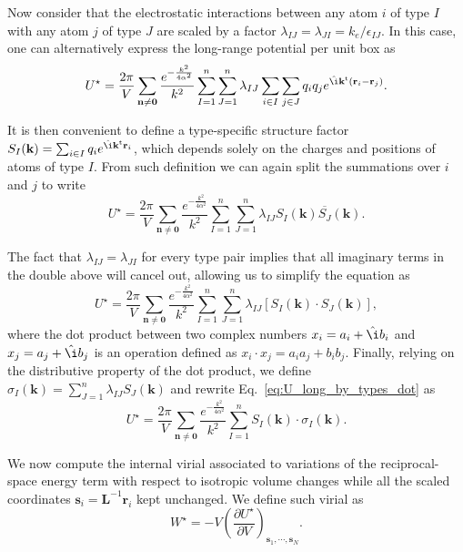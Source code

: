 \documentclass[11pt]{article}
\newcommand{\mt}[1]{\boldsymbol{\mathbf{#1}}}           %
\newcommand{\vt}[1]{\boldsymbol{\mathbf{#1}}}           %
\newcommand{\tr}[1]{#1^\text{t}}                        %
\newcommand{\diff}[2]{\frac{\partial #1}{\partial #2}}  %
\newcommand{\im}{\hat{\i}}                              %
\begin{document}
Now consider that the electrostatic interactions between any atom $i$ of type $I$ with any atom $j$ of type $J$ are scaled by a factor $\lambda_{IJ} = \lambda_{JI} = k_e/\epsilon_{IJ}$. In this case, one can alternatively express the long-range potential per unit box as
\begin{equation*}
U^\star = \frac{2\pi}{V}\sum_{\vt n \neq \vt 0} \frac{e^{-\frac{k^2}{4\alpha^2}}}{k^2} \sum_{I=1}^n \sum_{J=1}^n \lambda_{IJ} \sum_{i \in I} \sum_{j \in J} q_i q_j e^{\im \tr{\vt k}({\vt r}_i - {\vt r}_j)}.
\end{equation*}

It is then convenient to define a type-specific structure factor $S_I(\vt k) = \sum_{i \in I} q_i e^{\im \tr{\vt k}{\vt r}_i}$, which depends solely on the charges and positions of atoms of type $I$. From such definition we can again split the summations over $i$ and $j$ to write
\begin{equation}
\label{eq:U_long_by_types_1}
U^\star = \frac{2\pi}{V}\sum_{\vt n \neq \vt 0} \frac{e^{-\frac{k^2}{4\alpha^2}}}{k^2} \sum_{I=1}^n \sum_{J=1}^n \lambda_{IJ} S_I(\vt k) \overline{S_J}(\vt k).
\end{equation}

The fact that $\lambda_{IJ} = \lambda_{JI}$ for every type pair implies that all imaginary terms in the double above will cancel out, allowing us to simplify the equation as
\begin{equation}
\label{eq:U_long_by_types_dot}
U^\star = \frac{2\pi}{V}\sum_{\vt n \neq \vt 0} \frac{e^{-\frac{k^2}{4\alpha^2}}}{k^2} \sum_{I=1}^n \sum_{J=1}^n \lambda_{IJ} [S_I(\vt k) \cdot S_J(\vt k)],
\end{equation}
where the dot product between two complex numbers $x_i = a_i + \im b_i$ and $x_j = a_j + \im b_j$ is an operation defined as $x_i \cdot x_j = a_i a_j + b_i b_j$. Finally, relying on the distributive property of the dot product, we define $\sigma_I(\vt k) = \sum_{J=1}^n \lambda_{IJ} S_J(\vt k)$ and rewrite Eq.~\ref{eq:U_long_by_types_dot} as
\begin{equation*}
U^\star = \frac{2\pi}{V}\sum_{\vt n \neq \vt 0} \frac{e^{-\frac{k^2}{4\alpha^2}}}{k^2} \sum_{I=1}^n S_I(\vt k) \cdot \sigma_I(\vt k).
\end{equation*}

We now compute the internal virial associated to variations of the reciprocal-space energy term with respect to isotropic volume changes while all the scaled coordinates $\vt s_i = {\mt L}^{-1}\vt r_i$ kept unchanged. We define such virial as
\begin{equation*}
W^\star = -V\left(\diff{U^\star}{V}\right)_{{\vt s}_1,\cdots,{\vt s}_N}.
\end{equation*}
\end{document}
